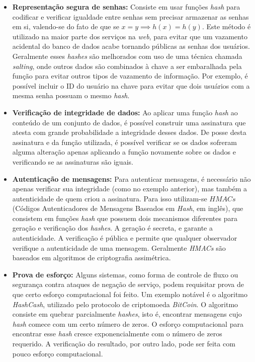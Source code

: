 \begin{itemize}
  \item \textbf{Representação segura de senhas:} Consiste em usar funções \emph{hash} para codificar e verificar igualdade entre senhas sem precisar armazenar as senhas em si, valendo-se do fato de que se $x = y \implies h(x) = h(y)$. Este método é utilizado na maior parte dos serviços na \emph{web}, para evitar que um vazamento acidental do banco de dados acabe tornando públicas as senhas dos usuários. Geralmente esses \emph{hashes} são melhorados com uso de uma técnica chamada \emph{salting}, onde outros dados são combinados à chave a ser embaralhada pela função para evitar outros tipos de vazamento de informação. Por exemplo, é possível incluir o ID do usuário na chave para evitar que dois usuários com a mesma senha possuam o mesmo \emph{hash}.

  \item \textbf{Verificação de integridade de dados:} Ao aplicar uma função \emph{hash} ao conteúdo de um conjunto de dados, é possível construir uma assinatura que atesta com grande probabilidade a integridade desses dados. De posse desta assinatura e da função utilizada, é possível verificar se os dados sofreram alguma alteração apenas aplicando a função novamente sobre os dados e verificando se as assinaturas são iguais.
  
  \item \textbf{Autenticação de mensagens:} Para autenticar mensagens, é necessário não apenas verificar sua integridade (como no exemplo anterior), mas também a autenticidade de quem criou a assinatura. Para isso utilizam-se $HMACs$ (Códigos Autenticadores de Mensagens Baseados em \emph{Hash}, em inglês), que consistem em funções \emph{hash} que possuem dois mecanismos diferentes para geração e verificação dos \emph{hashes}. A geração é secreta, e garante a autenticidade. A verificação é pública e permite que qualquer observador verifique a autenticidade de uma mensagem. Geralmente \emph{HMACs} são baseados em algoritmos de criptografia assimétrica.
  
  \item \textbf{Prova de esforço:} Alguns sistemas, como forma de controle de fluxo ou segurança contra ataques de negação de serviço, podem requisitar prova de que certo esforço computacional foi feito. Um exemplo notável é o algoritmo \emph{HashCash}, utilizado pelo protocolo de criptomoeda \emph{BitCoin}. O algoritmo consiste em quebrar parcialmente \emph{hashes}, isto é, encontrar mensagens cujo \emph{hash} comece com um certo número de zeros. O esforço computacional para encontrar esse \emph{hash} cresce exponencialmente com o número de zeros requerido. A verificação do resultado, por outro lado, pode ser feita com pouco esforço computacional.
  
\end{itemize}

